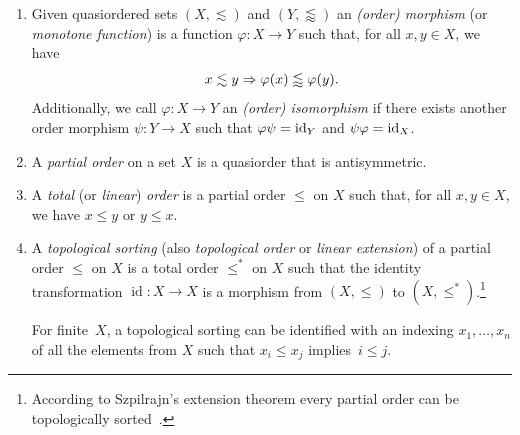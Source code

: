 \begin{enumerate}
	
	\item %
	Given quasiordered sets $(X, \lesssim)$ and $(Y, \lessapprox)$
	an \emph{(order) morphism} (or \emph{monotone function}) is a function $\varphi \colon X \to Y$  
	such that, for all $x,y \in X$, we have
	\[
	x \lesssim y \Rightarrow \varphi(x) \lessapprox \varphi(y).
	\] 
	Additionally, we call $\varphi \colon X \to Y$ an \emph{(order) isomorphism} if there exists another order morphism 
	$\psi \colon Y \to X$ such that $\varphi \psi = \operatorname{id}_Y$
	and $\psi \varphi = \operatorname{id}_X$.	
	
	\item A \emph{partial order} on a set $X$ is a quasiorder that is antisymmetric.
	
	\item A \emph{total} (or \emph{linear}) \emph{order} is a partial order $\le$ on $X$ such that,
	for all $x,y \in X$, we have
	$	x \le y \text{ or } y \le x.
	$
	
	 
	\item A \emph{topological sorting} (also \emph{topological order} or \emph{linear extension})
	of a partial order $\le$ on $X$ 
	is a total order $\le^*$ on $X$ such
	that the identity transformation $\operatorname{id} \colon X \to X$ is a morphism from $(X, \le)$ to $(X, \le^*)$.\footnote{According
		to Szpilrajn's extension theorem every partial order
		can be topologically sorted~\cite{szpilrajn1930extension}.}
		
	For finite~$X$, a topological sorting 
	can be identified
	with an indexing $x_1, \ldots, x_n$ %
	of all the elements from $X$ such that
	$x_i \le x_j$ implies~$i \le j$.
		


     


\end{enumerate}
